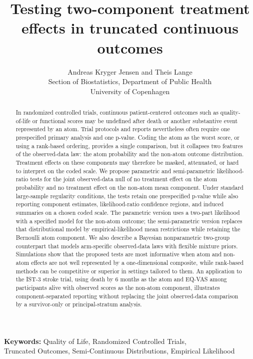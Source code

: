 \documentclass[11pt]{article}
\title{Testing two-component treatment effects in truncated continuous outcomes}
\author{
  Andreas Kryger Jensen and Theis Lange\\
  Section of Biostatistics, Department of Public Health\\
  University of Copenhagen
}
\date{}
\begin{document}
\maketitle

\begin{abstract}
In randomized controlled trials, continuous patient-centered outcomes such as quality-of-life or functional scores may be undefined after death or another substantive event represented by an atom. Trial protocols and reports nevertheless often require one prespecified primary analysis and one p-value. Coding the atom as the worst score, or using a rank-based ordering, provides a single comparison, but it collapses two features of the observed-data law: the atom probability and the non-atom outcome distribution. Treatment effects on these components may therefore be masked, attenuated, or hard to interpret on the coded scale. We propose parametric and semi-parametric likelihood-ratio tests for the joint observed-data null of no treatment effect on the atom probability and no treatment effect on the non-atom mean component. Under standard large-sample regularity conditions, the tests retain one prespecified p-value while also reporting component estimates, likelihood-ratio confidence regions, and induced summaries on a chosen coded scale. The parametric version uses a two-part likelihood with a specified model for the non-atom outcome; the semi-parametric version replaces that distributional model by empirical-likelihood mean restrictions while retaining the Bernoulli atom component. We also describe a Bayesian nonparametric two-group counterpart that models arm-specific observed-data laws with flexible mixture priors. Simulations show that the proposed tests are most informative when atom and non-atom effects are not well represented by a one-dimensional composite, while rank-based methods can be competitive or superior in settings tailored to them. An application to the IST-3 stroke trial, using death by 6 months as the atom and EQ-VAS among participants alive with observed scores as the non-atom component, illustrates component-separated reporting without replacing the joint observed-data comparison by a survivor-only or principal-stratum analysis.
\end{abstract}

\begin{center}
\textbf{Keywords:} Quality of Life, Randomized Controlled Trials,\\
Truncated Outcomes, Semi-Continuous Distributions, Empirical Likelihood
\end{center}
\end{document}
